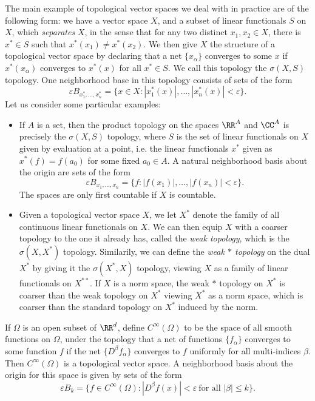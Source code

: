 \begin{example}
    The main example of topological vector spaces we deal with in practice are of the following form: we have a vector space $X$, and a subset of linear functionals $S$ on $X$, which \emph{separates} $X$, in the sense that for any two distinct $x_1,x_2 \in X$, there is $x^* \in S$ such that $x^*(x_1) \neq x^*(x_2)$. We then give $X$ the structure of a topological vector space by declaring that a net $\{ x_\alpha \}$ converges to some $x$ if $x^*(x_\alpha)$ converges to $x^*(x)$ for all $x^* \in S$. We call this topology the $\sigma(X,S)$ topology. One neighborhood base in this topology consists of sets of the form
    \[ \varepsilon B_{x_1^*, \dots, x_n^*} = \{ x \in X: |x_1^*(x)|, \dots, |x_n^*(x)| < \varepsilon \}. \]
    Let us consider some particular examples:
    \begin{itemize}
        \item If $A$ is a set, then the product topology on the spaces $\RR^A$ and $\CC^A$ is precisely the $\sigma(X,S)$ topology, where $S$ is the set of linear functionals on $X$ given by evaluation at a point, i.e. the linear functionals $x^*$ given as $x^*(f) = f(a_0)$ for some fixed $a_0 \in A$. A natural neighborhood basis about the origin are sets of the form
        \[ \varepsilon B_{x_1,\dots,x_n} = \{ f : |f(x_1)|, \dots, |f(x_n)| < \varepsilon \}. \]
        The spaces are only first countable if $X$ is countable.

        \item Given a topological vector space $X$, we let $X^*$ denote the family of all continuous linear functionals on $X$. We can then equip $X$ with a coarser topology to the one it already has, called the \emph{weak topology}, which is the $\sigma(X,X^*)$ topology. Similarily, we can define the \emph{weak $*$ topology} on the dual $X^*$ by giving it the $\sigma(X^*,X)$ topology, viewing $X$ as a family of linear functionals on $X^{**}$. If $X$ is a norm space, the weak $*$ topology on $X^*$ is coarser than the weak topology on $X^*$ viewing $X^*$ as a norm space, which is coarser than the standard topology on $X^*$ induced by the norm.
    \end{itemize}
\end{example}

\begin{example}
    If $\Omega$ is an open subset of $\RR^d$, define $C^\infty(\Omega)$ to be the space of all smooth functions on $\Omega$, under the topology that a net of functions $\{ f_\alpha \}$ converges to some function $f$ if the net $\{ D^\beta f_\alpha \}$ converges to $f$ uniformly for all multi-indices $\beta$. Then $C^\infty(\Omega)$ is a topological vector space. A neighborhood basis about the origin for this space is given by sets of the form
    \[ \varepsilon B_k = \{ f \in C^\infty(\Omega): |D^\beta f(x)| < \varepsilon\ \text{for all $|\beta| \leq k$} \}. \]
\end{example}

